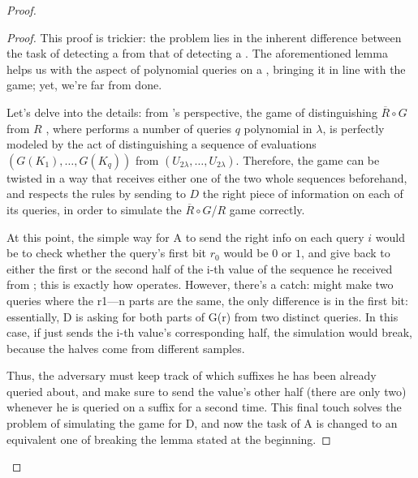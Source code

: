 \begin{proof}
    \begin{proof}


        This proof is trickier: the problem lies in the inherent difference between the task of detecting a \prg{} from that of detecting a \prf{}. The aforementioned lemma helps us with the aspect of polynomial queries on a \prg{}, bringing it in line with the \prf{} game; yet, we're far from done.

        Let's delve into the details: from \adversary's perspective, the game of distinguishing $\overline{R} \circ G$ from $R$ , where \distinguisher{} performs a number of queries $q$ polynomial in $\lambda$, is perfectly modeled by the act of distinguishing a sequence of evaluations $(G(K_1), \dots, G(K_q))$ from $(U_{2\lambda}, \dots, U_{2\lambda})$. Therefore, the game can be twisted in a way that \adversary{} receives either one of the two whole sequences beforehand, and respects the rules by sending to $D$ the right piece of information on each of its queries, in order to simulate the $\overline{R} \circ G$/$R$ game correctly.

        At this point, the simple way for A to send the right info on each query $i$ would be to check whether the query's first bit $r_0$ would be $0$ or $1$, and give back to \distinguisher{} either the first or the second half of the i-th value of the sequence he received from \challenger{}; this is exactly how \ggm{} operates. However, there's a catch: \distinguisher{} might make two queries where the r1---n parts are the same, the only difference is in the first bit: essentially, D is asking for both parts of G(r) from two distinct queries. In this case, if \adversary{} just sends the i-th value's corresponding half, the simulation would break, because the halves come from different samples.
        
        Thus, the adversary must keep track of which suffixes he has been already queried about, and make sure to send the value's other half (there are only two) whenever he is queried on a suffix for a second time. This final touch solves the problem of simulating the game for D, and now the task of A is changed to an equivalent one of breaking the lemma stated at the beginning.
        
\end{proof}
\end{proof}
